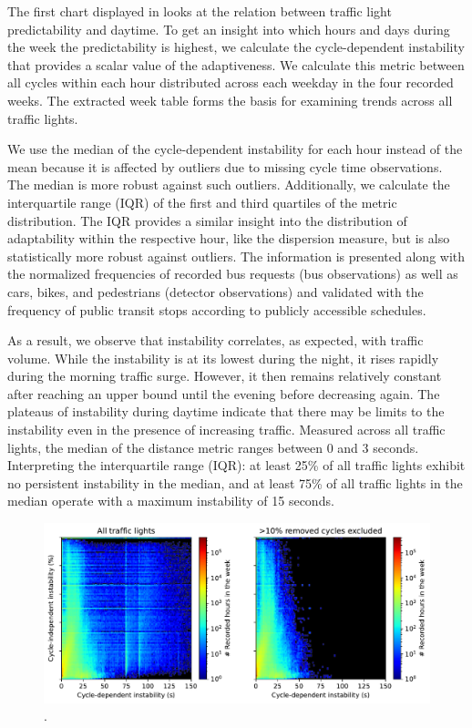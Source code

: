The first chart displayed in  looks at the relation between traffic light predictability and daytime. To get an insight into which hours and days during the week the predictability is highest, we calculate the cycle-dependent instability that provides a scalar value of the adaptiveness. We calculate this metric between all cycles within each hour distributed across each weekday in the four recorded weeks. The extracted week table forms the basis for examining trends across all traffic lights.

We use the median of the cycle-dependent instability for each hour instead of the mean because it is affected by outliers due to missing cycle time observations. The median is more robust against such outliers. Additionally, we calculate the interquartile range (IQR) of the first and third quartiles of the metric distribution. The IQR provides a similar insight into the distribution of adaptability within the respective hour, like the dispersion measure, but is also statistically more robust against outliers. The information is presented along with the normalized frequencies of recorded bus requests (bus observations) as well as cars, bikes, and pedestrians (detector observations) and validated with the frequency of public transit stops according to publicly accessible schedules.

As a result, we observe that instability correlates, as expected, with traffic volume. While the instability is at its lowest during the night, it rises rapidly during the morning traffic surge. However, it then remains relatively constant after reaching an upper bound until the evening before decreasing again. The plateaus of instability during daytime indicate that there may be limits to the instability even in the presence of increasing traffic. Measured across all traffic lights, the median of the distance metric ranges between 0 and 3 seconds. Interpreting the interquartile range (IQR): at least 25\% of all traffic lights exhibit no persistent instability in the median, and at least 75\% of all traffic lights in the median operate with a maximum instability of 15 seconds.

\begin{figure}[t]
    \centering
    \includegraphics[width=\linewidth]{images/predictability-heatmap.pdf}
    \caption{.}\label{fig:predictability-heatmap}
\end{figure}

